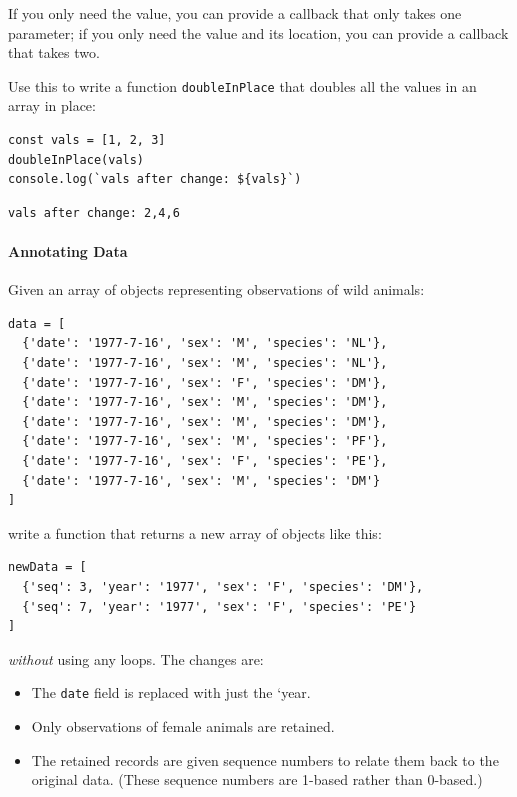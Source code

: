 If you only need the value, you can provide a callback that only takes
one parameter; if you only need the value and its location, you can
provide a callback that takes two.

Use this to write a function \texttt{doubleInPlace} that doubles all the
values in an array in place:

\begin{verbatim}
const vals = [1, 2, 3]
doubleInPlace(vals)
console.log(`vals after change: ${vals}`)
\end{verbatim}

\begin{verbatim}
vals after change: 2,4,6
\end{verbatim}

\paragraph{Annotating Data}\label{annotating-data}

Given an array of objects representing observations of wild animals:

\begin{verbatim}
data = [
  {'date': '1977-7-16', 'sex': 'M', 'species': 'NL'},
  {'date': '1977-7-16', 'sex': 'M', 'species': 'NL'},
  {'date': '1977-7-16', 'sex': 'F', 'species': 'DM'},
  {'date': '1977-7-16', 'sex': 'M', 'species': 'DM'},
  {'date': '1977-7-16', 'sex': 'M', 'species': 'DM'},
  {'date': '1977-7-16', 'sex': 'M', 'species': 'PF'},
  {'date': '1977-7-16', 'sex': 'F', 'species': 'PE'},
  {'date': '1977-7-16', 'sex': 'M', 'species': 'DM'}
]
\end{verbatim}

write a function that returns a new array of objects like this:

\begin{verbatim}
newData = [
  {'seq': 3, 'year': '1977', 'sex': 'F', 'species': 'DM'},
  {'seq': 7, 'year': '1977', 'sex': 'F', 'species': 'PE'}
]
\end{verbatim}

\emph{without} using any loops. The changes are:

\begin{itemize}
\tightlist
\item
  The \texttt{date} field is replaced with just the `year.
\item
  Only observations of female animals are retained.
\item
  The retained records are given sequence numbers to relate them back to
  the original data. (These sequence numbers are 1-based rather than
  0-based.)
\end{itemize}

